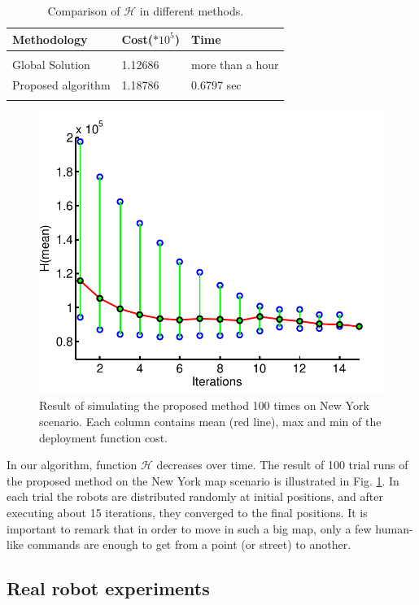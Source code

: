 \documentclass[smallcondensed]{svjour3}
\begin{document}
\begin{table}[t]
\centering
\caption{Comparison of $\mathcal{H}$ in different methods. }
\label{tbl:comparison}
\begin{tabular}{m{2.65cm}m{1.5cm}m{2.4cm}}
Methodology    & Cost($*10^5$) & Time  \\
 \hline\\
 Global Solution   &  1.12686 & more than a hour\\
Proposed algorithm & 1.18786  & 0.6797 sec\\
\hline\\
\end{tabular}
\end{table}

\begin{figure}
\centering
\includegraphics[width=0.7 \columnwidth]{Figures/Fig14.pdf}
\caption{Result of simulating the proposed method 100 times on New York scenario. Each column contains mean (red line), max and min of the deployment function cost.}
\label{fig:100sim}
\end{figure}

In our algorithm, function $\mathcal{H}$ decreases over time. The result of 100 trial runs of the proposed method on the New York map scenario is illustrated in Fig. \ref{fig:100sim}. In each trial the robots are distributed randomly at initial positions, and after executing about 15 iterations, they converged to the final positions. It is important to remark that in order to move in such a big map, only a few human-like commands are enough to get from a point (or street) to another.

\subsection{Real robot experiments}
\end{document}

